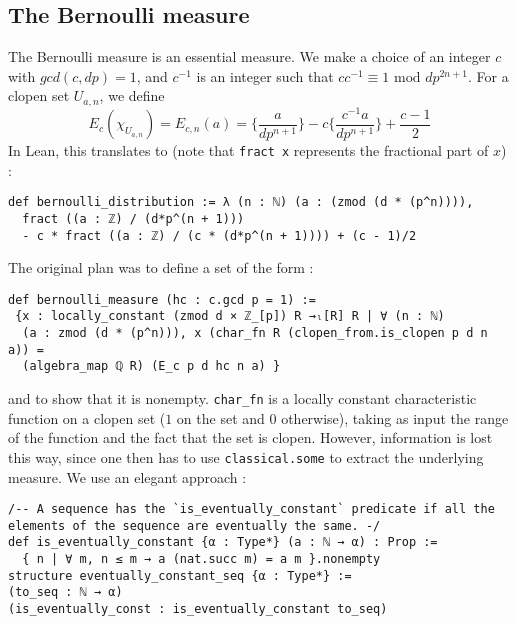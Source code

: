 \documentclass[a4paper,UKenglish,cleveref, autoref, thm-restate]{lipics-v2021}
\newcommand{\lean}[1]{\texttt{#1}\xspace} %
\begin{document}
\subsection{The Bernoulli measure}
The Bernoulli measure is an essential measure. We make a choice of an integer $c$ with
$gcd(c,dp) = 1$, and $c^{-1}$ is an integer such that $c c^{-1} \equiv 1 \text{ mod } dp^{2n+1}$.
For a clopen set $U_{a,n}$, we define
$$ E_c (\chi_{U_{a,n}}) = E_{c,n} (a) = \bigg\{ \frac{a}{dp^{n + 1}} \bigg\} - c \bigg\{ \frac{c^{-1}a}{dp^{n + 1}} \bigg\} + \frac{c - 1}{2} $$
In Lean, this translates to (note that \lean{fract x} represents the fractional part of $x$) :
\begin{lstlisting}
def bernoulli_distribution := λ (n : ℕ) (a : (zmod (d * (p^n)))), 
  fract ((a : ℤ) / (d*p^(n + 1))) 
  - c * fract ((a : ℤ) / (c * (d*p^(n + 1)))) + (c - 1)/2
\end{lstlisting}
The original plan was to define a set of the form : 
\begin{lstlisting}
def bernoulli_measure (hc : c.gcd p = 1) :=
 {x : locally_constant (zmod d × ℤ_[p]) R →ₗ[R] R | ∀ (n : ℕ) 
  (a : zmod (d * (p^n))), x (char_fn R (clopen_from.is_clopen p d n a)) = 
  (algebra_map ℚ R) (E_c p d hc n a) }
\end{lstlisting}
and to show that it is nonempty. \lean{char\_fn} is a locally constant characteristic function on a clopen set ($1$ on the set and $0$ otherwise), 
taking as input the range of the function and the fact that the set is clopen. However, information is lost this way, since one then has to use 
\lean{classical.some} to extract the underlying measure. We use an elegant approach :
\begin{lstlisting}
/-- A sequence has the `is_eventually_constant` predicate if all the elements of the sequence are eventually the same. -/
def is_eventually_constant {α : Type*} (a : ℕ → α) : Prop := 
  { n | ∀ m, n ≤ m → a (nat.succ m) = a m }.nonempty
structure eventually_constant_seq {α : Type*} :=
(to_seq : ℕ → α) 
(is_eventually_const : is_eventually_constant to_seq)
\end{lstlisting}
\end{document}
